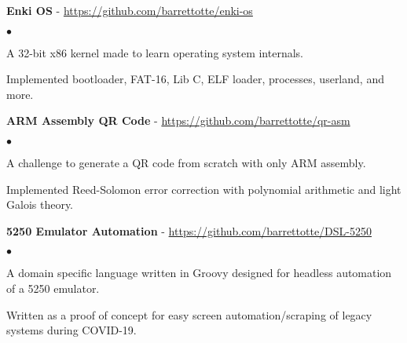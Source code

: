 \documentclass[a4paper]{article}
\newcommand{\project}[3]{
    \textbf{#1} - \href{#2}{#2}\hfill\textbf{#3}
}
\newenvironment{resumelist}{
    \vspace*{4pt}
    \begin{list}
        {\small$\bullet$}{\topsep 0pt \itemsep -2pt \leftmargin=22pt}}{\vspace*{4pt}
    \end{list}
}
\begin{document}
        \project{Enki OS}{https://github.com/barrettotte/enki-os}{}
            \begin{resumelist}
                \item A 32-bit x86 kernel made to learn operating system internals.
                \item Implemented bootloader, FAT-16, Lib C, ELF loader, processes, userland, and more.
            \end{resumelist}
        \vspace*{6pt}

        \project{ARM Assembly QR Code}{https://github.com/barrettotte/qr-asm}{}
            \begin{resumelist}
                \item A challenge to generate a QR code from scratch with only ARM assembly.
                \item Implemented Reed-Solomon error correction with polynomial arithmetic and light Galois theory.
            \end{resumelist}
        \vspace*{6pt}

        \project{5250 Emulator Automation}{https://github.com/barrettotte/DSL-5250}{}
            \begin{resumelist}
                \item A domain specific language written in Groovy designed for headless automation of a 5250 emulator.
                \item Written as a proof of concept for easy screen automation/scraping of legacy systems during COVID-19.
            \end{resumelist}
        \vspace*{6pt}
\end{document}
